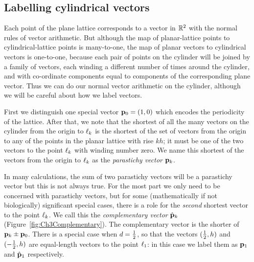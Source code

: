 \subsection{Labelling cylindrical vectors}
Each point of the plane lattice corresponds to a 
vector in $\mathbb{R}^2$ with the normal rules of vector arithmetic. But although the map of planar-lattice points to cylindrical-lattice points is many-to-one, the map of planar vectors to cylindrical vectors is one-to-one, because each pair of points on the cylinder will be joined by a family of vectors, each winding a different number of times around the cylinder, and with co-ordinate components equal to components of the corresponding plane vector.   Thus we can do our normal vector arithmetic on the cylinder, although we will  be careful about how we label vectors. 

First we distinguish one special vector ${\mathbf p}_{0}=(1,0)$ which encodes the periodicity of the lattice. After that, we note that the shortest of all the many vectors on the cylinder from the origin to $\ell_{{k}}$ is the shortest of the set of vectors from the origin to any of the points in the planar lattice with rise $kh$; it must be one of the two vectors to the point $\ell_{{k}}$ with winding number zero. 
We name this shortest of the vectors from the origin to $\ell_{{k}}$ as  the \textit{parastichy vector} ${\mathbf p}_{k}$.

In many calculations, the sum of two parastichy vectors will be a parastichy vector but this is not always true. 
For the most part we only need to be concerned with parastichy vectors, but for some (mathematically if not biologically)  significant special cases,  there is a role for the \textit{second} shortest vector to the point $\ell_{{k}}$. We call this the \emph{complementary vector} $\hat{\mathbf p}_{k}$ (Figure~\ref{fig:Ch3Complementary}). The complementary vector is the shorter of ${\mathbf p}_{k}\pm {\mathbf p}_{0}$. There is a  special case when $d=\textstyle{\frac{1}{2}}$, so that the vectors $(\textstyle{\frac{1}{2}},h)$ and $(-\textstyle{\frac{1}{2}},h)$ are equal-length vectors to the point $\ell_{{1}}$: in this case we label them as ${\mathbf p}_{1}$ and $\hat{\mathbf p}_{1}$ respectively.



